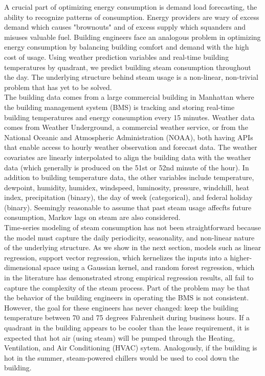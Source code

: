 \documentclass{article} %
\begin{document}
\begin{Introduction}
A crucial part of optimizing energy consumption is demand load forecasting, the ability to recognize patterns of consumption. Energy providers are wary of excess demand which causes "brownouts" and of excess supply which squanders and misuses valuable fuel. Building engineers face an analogous problem in optimizing energy consumption by balancing building comfort and demand with the high cost of usage. Using weather prediction variables and real-time building temperatures by quadrant, we predict building steam consumption throughout the day. The underlying structure behind steam usage is a non-linear, non-trivial problem that has yet to be solved.\\

\noindent
The building data comes from a large commercial building in Manhattan where the building management system (BMS) is tracking and storing real-time building temperatures and energy consumption every 15 minutes. Weather data comes from Weather Underground, a commercial weather service, or from the National Oceanic and Atmospheric Administration (NOAA), both having APIs that enable access to hourly weather observation and forecast data. The weather covariates are linearly interpolated to align the building data with the weather data (which generally is produced on the 51st or 52nd minute of the hour). In addition to building temperature data, the other variables include temperature, dewpoint, humidity, humidex, windspeed, luminosity, pressure, windchill, heat index, precipitation (binary), the day of week (categorical), and federal holiday (binary). Seemingly reasonable to assume that past steam usage affecfts future consumption, Markov lags on steam are also considered.
\\

\noindent
Time-series modeling of steam consumption has not been straightforward because the model must capture the daily periodicity, seasonality, and non-linear nature of the underlying structure. As we show in the next section, models such as linear regression, support vector regression, which kernelizes the inputs into a higher-dimensional space using a Gaussian kernel, and random forest regression, which in the literature has demonstrated strong empirical regression results, all fail to capture the complexity of the steam process. Part of the problem may be that the behavior of the building engineers in operating the BMS is not consistent. However, the goal for these engineers has never changed: keep the building temperature between 70 and 75 degrees Fahrenheit during business hours. If a quadrant in the building appears to be cooler than the lease requirement, it is expected that hot air (using steam) will be pumped through the Heating, Ventilation, and Air Conditioning (HVAC) sytem. Analogously, if the building is hot in the summer, steam-powered chillers would be used to cool down the building. \\


\end{Introduction}
\end{document}
